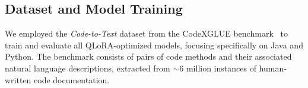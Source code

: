 

\begin{table}[h!]
	\centering
	\caption{QLoRA hyperparameters used in our experiments}
\end{table}



\smallskip

\subsection{Dataset and Model Training}
\label{sub:data}

We employed the \emph{Code-to-Text} dataset from the CodeXGLUE benchmark~\cite{codexglue, CodeXGLUEbench} to train and evaluate all QLoRA-optimized models, focusing specifically on Java and Python. The benchmark consists of pairs of code methods and their associated natural language descriptions, extracted from  $\sim$6 million instances of human-written code documentation.


